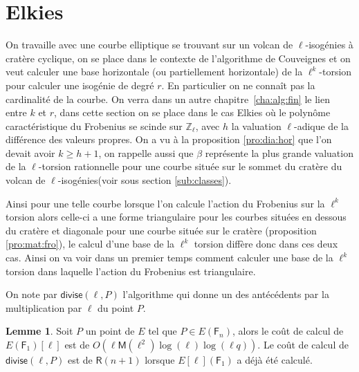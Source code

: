 \documentclass[10pt,a4paper]{book}
\theoremstyle{plain}
\theoremstyle{definition}
\newtheorem{lem}[thm]{Lemme}
\theoremstyle{definition}
\theoremstyle{definition}
\theoremstyle{definition}
\theoremstyle{remark}
\theoremstyle{remark}
\theoremstyle{definition}
\begin{document}
\section{Elkies}
On travaille avec une courbe elliptique se trouvant sur un volcan de $\ell$-isogénies à cratère cyclique, on se place dans le contexte de l'algorithme de Couveignes et on veut calculer une base horizontale (ou partiellement horizontale) de la $\ell^k$-torsion pour calculer une isogénie de degré $r$. En particulier on ne connaît pas la cardinalité de la courbe. On verra dans un autre chapitre~\ref{cha:alg:fin} le lien entre $k$ et $r$, dans cette section on se place dans le cas Elkies où le polynôme caractéristique du Frobenius se scinde sur $\mathbb{Z}_{\ell}$, avec $h$ la valuation $\ell$-adique de la différence des valeurs propres. On a vu à la proposition \ref{pro:dia:hor} que l'on devait avoir $k \geqslant h+1$, on rappelle aussi que $\beta$ représente la plus grande valuation de la $\ell$-torsion rationnelle pour une courbe située sur le sommet du cratère du volcan de $\ell$-isogénies(voir sous section \ref{sub:classes}).

Ainsi pour une telle courbe lorsque l'on calcule l'action du Frobenius sur la $\ell^k$ torsion alors celle-ci a une forme triangulaire pour les courbes situées en dessous du cratère et diagonale pour une courbe située sur le cratère (proposition \ref{pro:mat:fro}), le calcul d'une base de la $\ell^k$ torsion diffère donc dans ces deux cas. Ainsi on va voir dans un premier temps comment calculer une base de la $\ell^k$ torsion dans laquelle l'action du Frobenius est triangulaire.

On note par $\mathsf{divise}(\ell,P)$ l'algorithme qui donne un des antécédents par la multiplication par $\ell$ du point $P$.

\begin{lem}
\label{lem:div:cou}
Soit $P$ un point de $E$ tel que $P \in E(\mathsf{F}_{n})$, alors le coût de calcul de $E(\mathsf{F}_1)[\ell]$ est de $O(\ell \mathsf{M}(\ell^2)\log(\ell)\log(\ell q))$. Le coût de calcul de $\mathsf{divise}(\ell,P)$ est de $\mathsf{R}(n+1)$ lorsque $E[\ell](\mathsf{F}_1)$ a déjà été calculé.
\end{lem}
\end{document}
